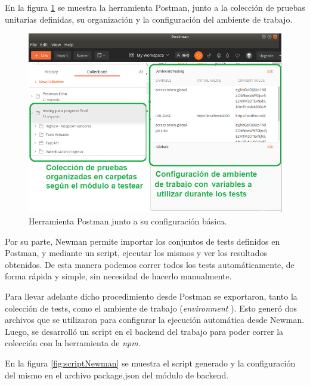 En la figura \ref{fig:Postmanconfig} se muestra la herramienta Postman, junto a la colección de pruebas unitarias definidas, su organización y la configuración del ambiente de trabajo.


\begin{figure}[ht]
	\centering
	\includegraphics[width=1\textwidth]{./Figures/postman.png}
	\caption{Herramienta Postman junto a su configuración básica.}
	\label{fig:Postmanconfig}
\end{figure}

Por su parte, Newman permite importar los conjuntos de tests definidos en Postman, y mediante un script, ejecutar los mismos y ver los resultados obtenidos. De esta manera podemos correr todos los tests automáticamente, de forma rápida y simple, sin necesidad de hacerlo manualmente.

Para llevar adelante dicho procedimiento desde Postman se exportaron, tanto la colección de tests, como el ambiente de trabajo (\textit{environment} \citep{WEBSITE:EnvironmentPostman}). Esto generó dos archivos que se utilizaron para configurar la ejecución automática desde Newman. Luego, se desarrolló un script en el backend del trabajo para poder correr la colección con la herramienta de \textit{npm}.

En la figura \ref{fig:scriptNewman} se muestra el script generado y la configuración del mismo en el archivo package.json del módulo de backend.


